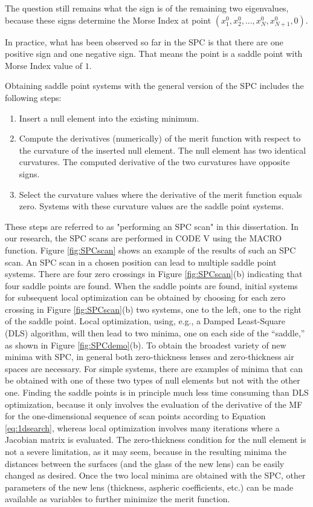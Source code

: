 The question still remains what the sign is of the remaining two eigenvalues, because these signs determine the Morse Index at point $(x^{0}_1, x^{0}_{2},...,x^{0}_{N},x^{0}_{N+1},0)$.
\vspace{0.3em}

In practice, what has been observed so far in the SPC is that there are one positive sign and one negative sign. That means the point is a saddle point with Morse Index value of $1$. 

Obtaining saddle point systems with the general version of the SPC includes the following steps:
\begin{enumerate}[nosep] \label{para: performing SPC scan}
\item Insert a null element into the existing minimum.
\item Compute the derivatives (numerically) of the merit function with respect to the curvature of the inserted null element. The null element has two identical curvatures. The computed derivative of the two curvatures have opposite signs. 
\item Select the curvature values where the derivative of the merit function equals zero. Systems with these curvature values are the saddle point systems. 
\end{enumerate}
These steps are referred to as "performing an SPC scan" in this dissertation.  In our research, the SPC scans are performed in CODE V using the MACRO function. Figure \ref{fig:SPCscan} shows an example of the results of such an SPC scan. An SPC scan in a chosen position can lead to multiple saddle point systems.  There are four zero crossings in Figure \ref{fig:SPCscan}(b) indicating that four saddle points are found. When the saddle points are found, initial systems for subsequent local optimization can be obtained by choosing for each zero crossing in Figure \ref{fig:SPCscan}(b) two systems, one to the left, one to the right of the saddle point. Local optimization, using, e.g., a Damped Least-Square (DLS) algorithm, will then lead to two minima, one on each side of the “saddle,” as shown in Figure \ref{fig:SPCdemo}(b). To obtain the broadest variety of new minima with SPC, in general both zero-thickness lenses and zero-thickness air spaces are necessary. For simple systems, there are examples of minima that can be obtained with one of these two types of null elements but not with the other one. Finding the saddle points is in principle much less time consuming than DLS optimization, because it only involves the evaluation of the derivative of the MF for the one-dimensional sequence of scan points according to Equation \ref{eq:1dsearch}, whereas local optimization involves many iterations where a Jacobian matrix is evaluated. The zero-thickness condition for the null element is not a severe limitation, as it may seem, because in the resulting minima the distances between the surfaces (and the glass of the new lens) can be easily changed as desired. Once the two local minima are obtained with the SPC, other parameters of the new lens (thickness, aspheric coefficients, etc.) can be made available as variables to further minimize the merit function.

